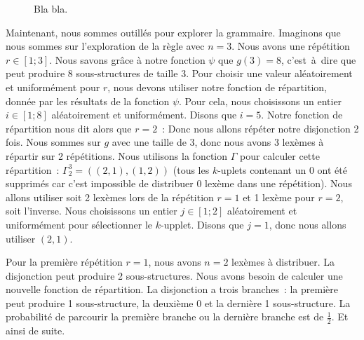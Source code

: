 \begin{example}
\begin{figure}
\caption{\label{figure:data:random_tabular} Bla bla.}

\end{figure}

Maintenant, nous sommes outillés pour explorer la grammaire. Imaginons que nous
sommes sur l'exploration de la règle  avec $n = 3$. Nous avons une
répétition $r \in [1; 3]$. Nous savons grâce à notre fonction $\psi$ que $g(3) =
8$, c'est~à~dire que  peut produire 8 sous-structures de taille 3.  Pour
choisir une valeur aléatoirement et uniformément pour $r$, nous devons utiliser
notre fonction de répartition, donnée par les résultats de la fonction $\psi$.
Pour cela, nous choisissons un entier $i \in [1; 8]$ aléatoirement et
uniformément.  Disons que $i = 5$. Notre fonction de répartition nous dit alors
que $r = 2$~: 
%
Donc nous allons répéter notre disjonction 2 fois. Nous sommes sur $g$ avec une
taille de 3, donc nous avons 3 lexèmes à répartir sur 2 répétitions. Nous
utilisons la fonction $\Gamma$ pour calculer cette répartition~: $\Gamma_2^3 =
((2, 1), (1, 2))$ (tous les $k$-uplets contenant un 0 ont été supprimés car
c'est impossible de distribuer 0 lexème dans une répétition). Nous allons
utiliser soit 2 lexèmes lors de la répétition $r = 1$ et 1 lexème pour $r = 2$,
soit l'inverse. Nous choisissons un entier $j \in [1; 2]$ aléatoirement et
uniformément pour sélectionner le $k$-upplet. Disons que $j = 1$, donc nous
allons utiliser $(2, 1)$.

Pour la première répétition $r = 1$, nous avons $n = 2$ lexèmes à distribuer. La
disjonction peut produire 2 sous-structures. Nous avons besoin de calculer une
nouvelle fonction de répartition. La disjonction a trois branches~: la première
peut produire 1 sous-structure, la deuxième 0 et la dernière 1 sous-structure.
La probabilité de parcourir la première branche ou la dernière branche est de
$\tfrac{1}{2}$. Et ainsi de suite.

\end{example}

